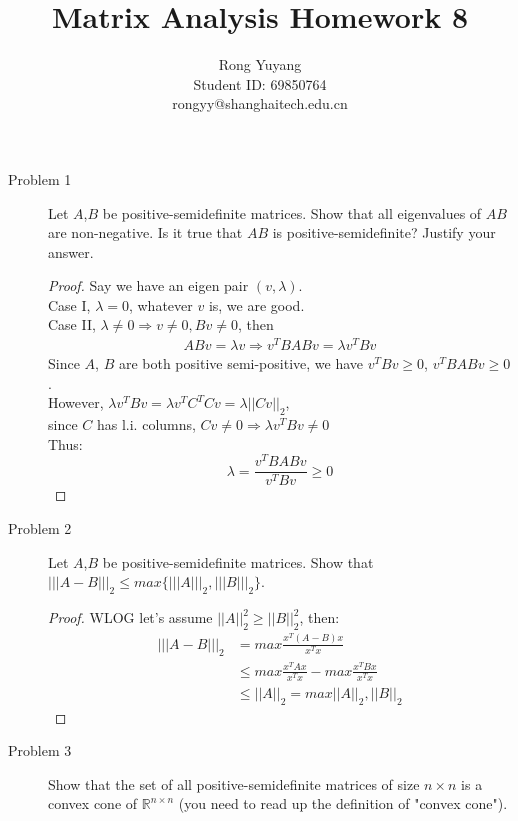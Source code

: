 \documentclass{article}
\title{Matrix Analysis Homework 8}
\author{Rong Yuyang \\ Student ID: 69850764 \\ rongyy@shanghaitech.edu.cn}
\begin{document}
\maketitle

\begin{description}
	\item[Problem 1] Let $A$,$B$ be positive-semidefinite matrices. Show that all eigenvalues of $AB$ are non-negative. Is it true that $AB$ is positive-semidefinite? Justify your answer. 
	\begin{proof}
		Say we have an eigen pair $(v, \lambda)$. \\
		Case I, $\lambda = 0$, whatever $v$ is, we are good. \\
		Case II, $\lambda \neq 0 \Rightarrow v \neq 0, Bv \neq 0$, then 
			\begin{equation}\begin{aligned}
							ABv = \lambda v 
			\Rightarrow v^TBABv = \lambda v^TBv
			\end{aligned}\end{equation}
		Since $A$, $B$ are both positive semi-positive, we have $v^TBv \geq 0$, $v^TBABv \geq 0$. \\
		However, $\lambda v^TBv = \lambda v^TC^TCv = \lambda ||Cv||_2$, \\since $C$ has l.i. columns, $Cv \neq 0 \Rightarrow \lambda v^TBv \neq 0$ \\
		Thus: 
			$$\lambda = \frac{v^TBABv}{v^TBv} \geq 0$$
	\end{proof}

	\item[Problem 2] Let $A$,$B$ be positive-semidefinite matrices. Show that $|||A - B|||_2 \leq max\{|||A|||_2,|||B|||_2\}$.
	\begin{proof}
		WLOG let's assume $||A||_2^2 \geq ||B||_2^2$, then:
		\begin{equation}\begin{aligned}
			 	|||A-B|||_2 
		& =  	max \frac{x^T(A-B)x}{x^Tx}  \\
		& \leq 	max\frac{x^TAx}{x^Tx} - max \frac{x^TBx}{x^Tx} \\
		& \leq 	||A||_2 = max{||A||_2, ||B||_2}
		\end{aligned}\end{equation}
	\end{proof}

	\item[Problem 3] Show that the set of all positive-semidefinite matrices of size $n \times n$ is a convex cone of $\mathbb{R}^{n\times n}$ (you need to read up the definition of "convex cone"). 


\end{description}
\end{document}

